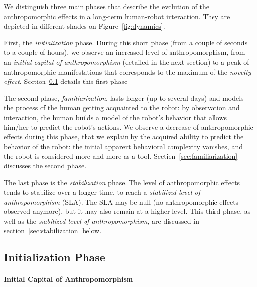 \documentclass{frontiersSCNS} %
\begin{document}
We distinguish three main phases that describe the evolution of the
anthropomorphic effects in a long-term human-robot interaction. They are
depicted in different shades on Figure~\ref{fig:dynamics}.

First, the \emph{initialization} phase. During this short phase (from a couple
of seconds to a couple of hours), we observe an increased level of
anthropomorphism, from an \emph{initial capital of anthropomorphism}
(detailed in the next section) to a peak of anthropomorphic manifestations
that corresponds to the maximum of the \emph{novelty effect}.
Section~\ref{sec:initialization} details this first phase.

The second phase, \emph{familiarization}, lasts longer (up to several days) and
models the process of the human getting acquainted to the robot: by observation
and interaction, the human builds a model of the robot's behavior that allows
him/her to predict the robot's actions. We observe a decrease of
anthropomorphic effects during this phase, that we explain by the acquired
ability to predict the behavior of the robot: the initial apparent behavioral
complexity vanishes, and the robot is considered more and more as a tool.
Section~\ref{sec:familiarization} discusses the second phase.

The last phase is the \emph{stabilization} phase. The level of anthropomorphic
effects tends to stabilize over a longer time, to reach a \emph{stabilized
level of anthropomorphism} (SLA). The SLA may be null (no anthropomorphic
effects observed anymore), but it may also remain at a higher level.  This
third phase, as well as the \emph{stabilized level of anthropomorphism}, are
discussed in section~\ref{sec:stabilization} below.

\subsection{Initialization Phase}
\label{sec:initialization}

\paragraph{Initial Capital of Anthropomorphism}
\label{sec:ica}
\end{document}
